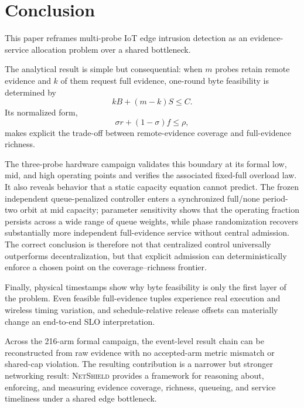 \documentclass[10pt,journal]{IEEEtran}
\newcommand{\NetShield}{\textsc{NetShield}}
\begin{document}
\section{Conclusion}
\label{sec:conclusion}

This paper reframes multi-probe IoT edge intrusion detection as an
evidence-service allocation problem over a shared bottleneck.

The analytical result is simple but consequential: when $m$ probes
retain remote evidence and $k$ of them request full evidence, one-round
byte feasibility is determined by
\[
kB+(m-k)S\leq C.
\]
Its normalized form,
\[
\sigma r+(1-\sigma)f\leq\rho,
\]
makes explicit the trade-off between remote-evidence coverage and
full-evidence richness.

The three-probe hardware campaign validates this boundary at its formal
low, mid, and high operating points and verifies the associated
fixed-full overload law. It also reveals behavior that a static capacity
equation cannot predict. The frozen independent queue-penalized
controller enters a synchronized full/none period-two orbit at mid
capacity; parameter sensitivity shows that the operating fraction
persists across a wide range of queue weights, while phase randomization
recovers substantially more independent full-evidence service without
central admission. The correct conclusion is therefore not that
centralized control universally outperforms decentralization, but that
explicit admission can deterministically enforce a chosen point on the
coverage--richness frontier.

Finally, physical timestamps show why byte feasibility is only the first
layer of the problem. Even feasible full-evidence tuples experience
real execution and wireless timing variation, and schedule-relative
release offsets can materially change an end-to-end SLO interpretation.

Across the 216-arm formal campaign, the event-level result chain can be
reconstructed from raw evidence with no accepted-arm metric mismatch or
shared-cap violation. The resulting contribution is a narrower but
stronger networking result: \NetShield{} provides a framework for
reasoning about, enforcing, and measuring evidence coverage, richness,
queueing, and service timeliness under a shared edge bottleneck.

\balance
\end{document}
